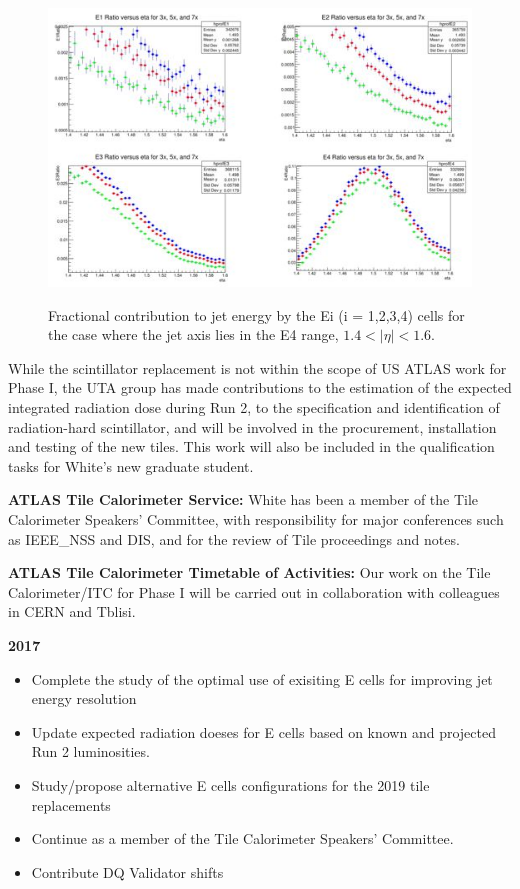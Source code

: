 \begin{figure}[htb]
\centering

      \includegraphics[scale=0.6]{images/E4_Energy_ratios.jpg}
      \label{fig:E4_Energy_ratios}

\caption{Fractional contribution to jet energy by the Ei (i = 1,2,3,4) cells for the case where the jet axis 
lies in the E4 range, $1.4 < |\eta| < 1.6$.}
\end{figure}

While the scintillator replacement is not within the scope of US ATLAS work for Phase I, 
the UTA group has made contributions to the estimation of the expected integrated radiation dose during
Run 2, to the specification and identification of radiation-hard
scintillator, and will be involved in the procurement, installation and testing of the new
tiles. This work will also be included in the qualification tasks for White's new graduate student.

\textbf{ATLAS Tile Calorimeter Service:}
White has been a member of the Tile Calorimeter Speakers' Committee, with responsibility for major conferences such as IEEE\_NSS and DIS, and for the review of Tile proceedings and notes.

\textbf{ATLAS Tile Calorimeter Timetable of Activities:}
Our work on the Tile Calorimeter/ITC for Phase I will be carried out in collaboration with colleagues
in CERN and Tblisi.

\textbf{2017}
\begin{itemize}[noitemsep,nolistsep]
\item{Complete the study of the optimal use of exisiting E cells for improving jet energy resolution}
\item{Update expected radiation doeses for E cells based on known and projected Run 2 luminosities.}
\item{Study/propose alternative E cells configurations for the 2019 tile replacements}
\item{Continue as a member of the Tile Calorimeter Speakers' Committee.}
\item{Contribute DQ Validator shifts}
\end{itemize}

